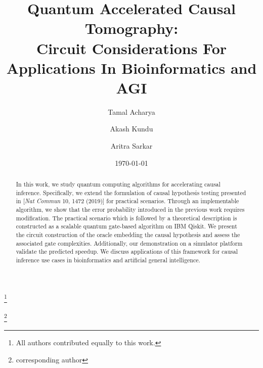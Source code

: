 \documentclass[%
 aps,
 jmp,%
 amsmath,amssymb,
 reprint,%
]{revtex4-2}
\begin{document}

\title[Quantum Accelerated Causal Tomography...]{Quantum Accelerated Causal Tomography: \\Circuit Considerations For Applications In Bioinformatics and AGI}%


\thanks{All authors contributed equally to this work.}

\author{Tamal Acharya}
%
\author{Akash Kundu}
\thanks{corresponding author}


%
\author{Aritra Sarkar}
%

\date{\today}%
             

\begin{abstract}
In this work, we study quantum computing algorithms for accelerating causal inference. Specifically, we extend the formulation of causal hypothesis testing presented in [\textit{Nat Commun} 10, 1472 (2019)] for practical scenarios. Through an implementable algorithm, we show that the error probability introduced in the previous work requires modification. The practical scenario which is followed by a theoretical description is constructed as a scalable quantum gate-based algorithm on IBM Qiskit. We present the circuit construction of the oracle embedding the causal hypothesis and assess the associated gate complexities. Additionally, our demonstration on a simulator platform validate the predicted speedup. We discuss applications of this framework for causal inference use cases in bioinformatics and artificial general intelligence.
\end{abstract}
\end{document}
